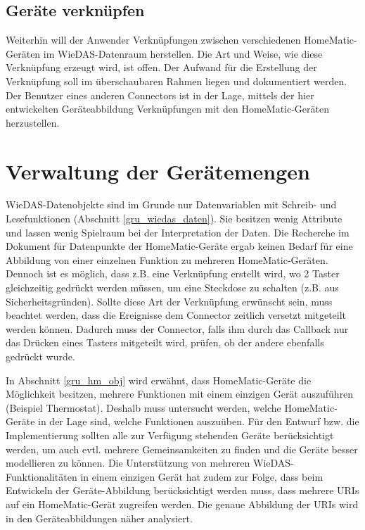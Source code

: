 \subsection{Geräte verknüpfen}
Weiterhin will der Anwender Verknüpfungen zwischen verschiedenen HomeMatic-Geräten im
WieDAS-Datenraum herstellen.
Die Art und Weise, wie diese Verknüpfung erzeugt wird, ist offen.
Der Aufwand für die Erstellung der Verknüpfung soll im überschaubaren Rahmen liegen und
dokumentiert werden.
Der Benutzer eines anderen Connectors ist in der Lage, mittels der hier entwickelten Geräteabbildung
Verknüpfungen mit den HomeMatic-Geräten herzustellen.

\section{Verwaltung der Gerätemengen}
\label{ana_gemenge}
WieDAS-Datenobjekte sind im Grunde nur Datenvariablen mit Schreib- und Lesefunktionen (Abschnitt \ref{gru_wiedas_daten}).
Sie besitzen wenig Attribute und lassen wenig Spielraum bei der Interpretation der Daten.
Die Recherche im Dokument für Datenpunkte der HomeMatic-Geräte \cite{hmscript4} ergab keinen
Bedarf für eine Abbildung von einer einzelnen Funktion zu mehreren HomeMatic-Geräten.
Dennoch ist es möglich, dass z.B. eine Verknüpfung erstellt wird, wo 2 Taster gleichzeitig
gedrückt werden müssen, um eine Steckdose zu schalten (z.B. aus Sicherheitsgründen).
Sollte diese Art der Verknüpfung erwünscht sein, muss beachtet werden, dass die Ereignisse
dem Connector zeitlich versetzt mitgeteilt werden können.
Dadurch muss der Connector, falls ihm durch das Callback nur das Drücken eines Tasters
mitgeteilt wird, prüfen, ob der andere ebenfalls gedrückt wurde.

In Abschnitt \ref{gru_hm_obj} wird erwähnt, dass HomeMatic-Geräte die Möglichkeit besitzen,
mehrere Funktionen mit einem einzigen Gerät auszuführen (Beispiel Thermostat).
Deshalb muss untersucht werden, welche HomeMatic-Geräte in der Lage sind, welche Funktionen
auszuüben.
Für den Entwurf bzw. die Implementierung sollten alle zur Verfügung stehenden Geräte
berücksichtigt werden, um auch evtl. mehrere Gemeinsamkeiten zu finden und die Geräte
besser modellieren zu können.
Die Unterstützung von mehreren WieDAS-Funktionalitäten in einem einzigen Gerät hat zudem
zur Folge, dass beim Entwickeln der Geräte-Abbildung berücksichtigt werden muss, dass mehrere
URIs auf ein HomeMatic-Gerät zugreifen werden.
Die genaue Abbildung der URIs wird in den Geräteabbildungen näher analysiert.

